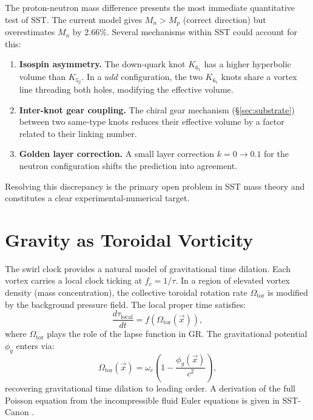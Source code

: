 \documentclass[11pt,a4paper]{article}
\begin{document}
The proton-neutron mass difference presents the most immediate quantitative test of
SST. The current model gives $M_n > M_p$ (correct direction) but overestimates $M_n$
by $2.66\%$. Several mechanisms within SST could account for this:

\begin{enumerate}
  \item \textbf{Isospin asymmetry.} The down-quark knot $K_{6_1}$ has a higher
        hyperbolic volume than $K_{5_2}$. In a $udd$ configuration, the two
        $K_{6_1}$ knots share a vortex line threading both holes, modifying
        the effective volume.
  \item \textbf{Inter-knot gear coupling.} The chiral gear mechanism
        (\S\ref{sec:substrate}) between two same-type knots reduces their
        effective volume by a factor related to their linking number.
  \item \textbf{Golden layer correction.} A small layer correction
        $k = 0 \to 0.1$ for the neutron configuration shifts the prediction into
        agreement.
\end{enumerate}

Resolving this discrepancy is the primary open problem in SST mass theory and
constitutes a clear experimental-numerical target.

\section{Gravity as Toroidal Vorticity}\label{sec:gravity}

The swirl clock provides a natural model of gravitational time dilation. Each vortex
carries a local clock ticking at $f_c = 1/\tau$. In a region of elevated vortex
density (mass concentration), the collective toroidal rotation rate $\Omega_\text{tor}$
is modified by the background pressure field. The local proper time satisfies:
\[
  \frac{d\tau_\text{local}}{dt} = f\!\left(\Omega_\text{tor}(\vec{x})\right),
\]
where $\Omega_\text{tor}$ plays the role of the lapse function in GR. The
gravitational potential $\phi_g$ enters via:
\[
  \Omega_\text{tor}(\vec{x}) = \omega_c\left(1 - \frac{\phi_g(\vec{x})}{c^2}\right),
\]
recovering gravitational time dilation to leading order. A derivation of the full
Poisson equation from the incompressible fluid Euler equations is given in
SST-Canon \cite{Iskandarani2025Canon}.
\end{document}
